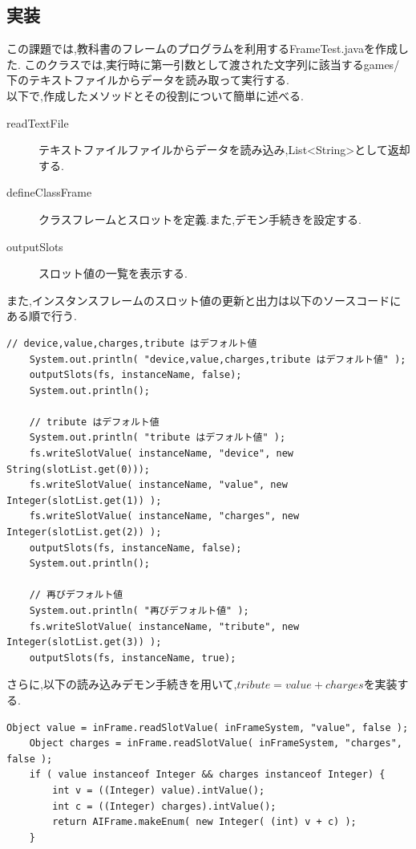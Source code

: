 \documentclass[uplatex,12pt]{jsarticle}
\begin{document}
\subsection{実装}
この課題では,教科書のフレームのプログラムを利用するFrameTest.javaを作成した.
このクラスでは,実行時に第一引数として渡された文字列に該当するgames/下のテキストファイルからデータを読み取って実行する. \\
以下で,作成したメソッドとその役割について簡単に述べる.
\begin{description}
    \item[readTextFile] テキストファイルファイルからデータを読み込み,List<String>として返却する.
    \item[defineClassFrame] クラスフレームとスロットを定義.また,デモン手続きを設定する.
    \item[outputSlots] スロット値の一覧を表示する.
\end{description}
また,インスタンスフレームのスロット値の更新と出力は以下のソースコードにある順で行う.
\begin{lstlisting}[caption=インスタンスフレームのスロット値の更新と出力プログラム, label=mid]
    // device,value,charges,tribute はデフォルト値
    System.out.println( "device,value,charges,tribute はデフォルト値" );
    outputSlots(fs, instanceName, false);
    System.out.println();

    // tribute はデフォルト値
    System.out.println( "tribute はデフォルト値" );
    fs.writeSlotValue( instanceName, "device", new String(slotList.get(0)));
    fs.writeSlotValue( instanceName, "value", new Integer(slotList.get(1)) );
    fs.writeSlotValue( instanceName, "charges", new Integer(slotList.get(2)) );
    outputSlots(fs, instanceName, false);
    System.out.println();

    // 再びデフォルト値
    System.out.println( "再びデフォルト値" );
    fs.writeSlotValue( instanceName, "tribute", new Integer(slotList.get(3)) );
    outputSlots(fs, instanceName, true);
\end{lstlisting}
さらに,以下の読み込みデモン手続きを用いて,$tribute = value + charges$を実装する.
\begin{lstlisting}[caption=AIDemonProcReadTest.javaにおける読み込みデモン手続き, label=mid]
    Object value = inFrame.readSlotValue( inFrameSystem, "value", false );
    Object charges = inFrame.readSlotValue( inFrameSystem, "charges", false );
    if ( value instanceof Integer && charges instanceof Integer) {
        int v = ((Integer) value).intValue();
        int c = ((Integer) charges).intValue();
        return AIFrame.makeEnum( new Integer( (int) v + c) );
    }
\end{lstlisting}
\end{document}
